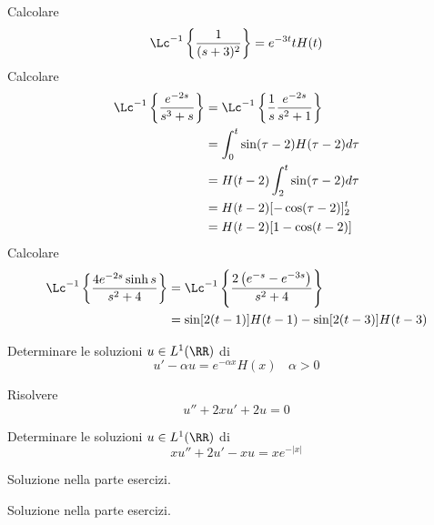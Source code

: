\Esercizio{}

Calcolare
\begin{equation*}
\Lc^{- 1}\left\{\frac{1}{(s + 3)^{2}}\right\} = e^{- 3t} tH(t)
\end{equation*}
Calcolare
\begin{equation*}
\begin{aligned}
\Lc^{- 1}\left\{\frac{e^{- 2s}}{s^{3} + s}\right\} & = \Lc^{- 1}\left\{\frac{1}{s}\frac{e^{- 2s}}{s^{2} + 1}\right\}\\
 & = \int^{t}_{0}\sin(\tau - 2) H(\tau - 2) d\tau \\
 & = H(t - 2)\int^{t}_{2}\sin(\tau - 2) d\tau \\
 & = H(t - 2)[ - \cos(\tau - 2)]^{t}_{2}\\
 & = H(t - 2)[ 1 - \cos(t - 2)]
\end{aligned}
\end{equation*}
Calcolare
\begin{equation*}
\begin{aligned}
\Lc^{- 1}\left\{\frac{4e^{- 2s}\sinh s}{s^{2} + 4}\right\} & = \Lc^{- 1}\left\{\frac{2\left(e^{- s} - e^{- 3s}\right)}{s^{2} + 4}\right\}\\
 & = \sin[ 2(t - 1)] H(t - 1) - \sin[ 2(t - 3)] H(t - 3)
\end{aligned}
\end{equation*}

\Esercizio{}

Determinare le soluzioni $u\in L^{1}(\RR)$ di
\begin{equation*}
u' - \alpha u = e^{- \alpha x} H(x) \ \ \ \ \alpha > 0
\end{equation*}

\Esercizio{}

Risolvere
\begin{equation*}
u'' + 2xu' + 2u = 0
\end{equation*}

\Esercizio{}

Determinare le soluzioni $u\in L^{1}(\RR)$ di
\begin{equation*}
xu'' + 2u' - xu = xe^{- | x|}
\end{equation*}

\ParteSoluzioni

\Soluzione

Soluzione nella parte esercizi.

\Soluzione

Soluzione nella parte esercizi.

\Soluzione

